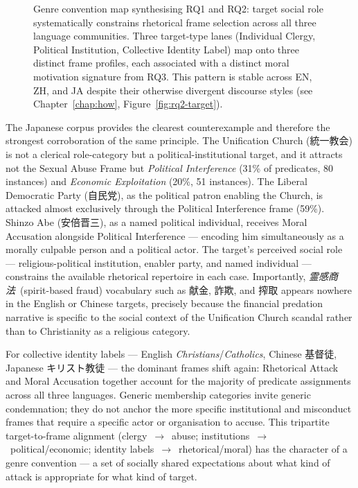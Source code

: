 \documentclass[../CLthesis.tex]{subfiles}
\begin{document}
\begin{figure}[t]
  
  \caption{Genre convention map synthesising RQ1 and RQ2: target social role systematically constrains rhetorical frame selection across all three language communities. Three target-type lanes (Individual Clergy, Political Institution, Collective Identity Label) map onto three distinct frame profiles, each associated with a distinct moral motivation signature from RQ3. This pattern is stable across EN, ZH, and JA despite their otherwise divergent discourse styles (see Chapter~\ref{chap:how}, Figure~\ref{fig:rq2-target}).}
  \label{fig:disc-genre-map}
\end{figure}

The Japanese corpus provides the clearest counterexample and therefore the strongest corroboration of the same principle. The Unification Church (統一教会) is not a clerical role-category but a political-institutional target, and it attracts not the Sexual Abuse Frame but \textit{Political Interference} (31\% of predicates, 80 instances) and \textit{Economic Exploitation} (20\%, 51 instances). The Liberal Democratic Party (自民党), as the political patron enabling the Church, is attacked almost exclusively through the Political Interference frame (59\%). Shinzo Abe (安倍晋三), as a named political individual, receives Moral Accusation alongside Political Interference --- encoding him simultaneously as a morally culpable person and a political actor. The target's perceived social role --- religious-political institution, enabler party, and named individual --- constrains the available rhetorical repertoire in each case. Importantly, \textit{霊感商法}~(spirit-based fraud) vocabulary such as 献金, 詐欺, and 搾取 appears nowhere in the English or Chinese targets, precisely because the financial predation narrative is specific to the social context of the Unification Church scandal rather than to Christianity as a religious category.

For collective identity labels --- English \textit{Christians}/\textit{Catholics}, Chinese 基督徒, Japanese キリスト教徒 --- the dominant frames shift again: Rhetorical Attack and Moral Accusation together account for the majority of predicate assignments across all three languages. Generic membership categories invite generic condemnation; they do not anchor the more specific institutional and misconduct frames that require a specific actor or organisation to accuse. This tripartite target-to-frame alignment (clergy~$\to$~abuse; institutions~$\to$~political/economic; identity labels~$\to$~rhetorical/moral) has the character of a genre convention --- a set of socially shared expectations about what kind of attack is appropriate for what kind of target.
\end{document}
